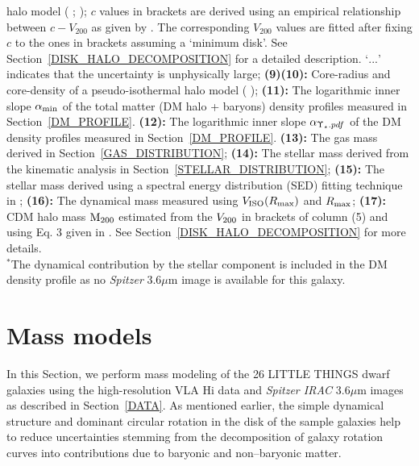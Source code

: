 \documentclass[natbib209]{emulateapj}
\begin{document}
\begin{table}
\begin{center}
\begin{minipage}{225mm}
{halo model (\citeauthor{NFW_1995} \citeyear{NFW_1995}; \citeyear{NFW_1996});
$c$ values in brackets are derived using an empirical relationship between $c -
V_{200}$ as given by \cite{McGaugh_2007}. The corresponding $V_{200}$ values are fitted after
fixing $c$ to the ones in brackets assuming a `minimum disk'. See
Section~\ref{DISK_HALO_DECOMPOSITION} for a detailed description. `$...$' indicates that the uncertainty is unphysically large;
{\bf (9)(10):} Core-radius and core-density of a pseudo-isothermal halo model
(\citeauthor{Begeman_1991} \citeyear{Begeman_1991});
{\bf (11):} The logarithmic inner slope $\alpha_{\rm min}$ of the total matter (DM halo + baryons) density profiles measured in Section~\ref{DM_PROFILE}.
{\bf (12):} The logarithmic inner slope $\alpha_{\Upsilon_{\star}.pdf}$ of the DM density profiles measured in Section~\ref{DM_PROFILE}.
{\bf (13):} The gas mass derived in Section~\ref{GAS_DISTRIBUTION};
{\bf (14):} The stellar mass derived from the kinematic analysis in Section~\ref{STELLAR_DISTRIBUTION};
{\bf (15):} The stellar mass derived using a spectral energy distribution (SED) fitting technique in \cite{Zhang_2012};
{\bf (16):} The dynamical mass measured using $V_{\rm ISO}(R_{\rm max})$ and $R_{\rm max}$;
{\bf (17):} CDM halo mass $\rm M_{\rm 200}$ estimated from the $V_{\rm 200}$ in
brackets of column (5) and using Eq. 3 given in \cite{Oh_2011b}. See
Section~\ref{DISK_HALO_DECOMPOSITION} for more details. \\
$^{*}$The dynamical contribution by the stellar component is included in the DM density profile as no {\it Spitzer} 3.6$\mu$m image is available for this galaxy.}

\end{minipage}
\end{center}
\end{table}

\section{Mass models} \label{MASS_MODELS}
In this Section, we perform mass modeling of the 26 LITTLE THINGS dwarf galaxies using the
high-resolution VLA H{\sc i} data and {\it Spitzer IRAC} 3.6$\mu$m images as described in
Section~\ref{DATA}. As mentioned earlier, the simple dynamical structure and dominant
circular rotation in the disk of the sample galaxies help to reduce
uncertainties stemming from the decomposition of galaxy rotation
curves into contributions due to baryonic and non--baryonic matter.
\end{document}

